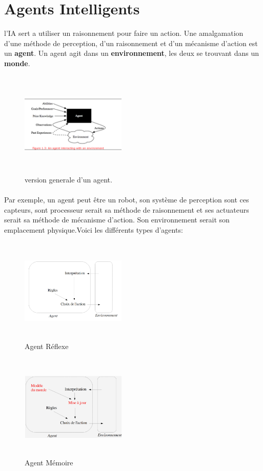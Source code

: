 \documentclass{book}
\begin{document}
\section{Agents Intelligents}
l'IA sert a utiliser un raisonnement pour faire un action. Une amalgamation d'une méthode de perception, d'un raisonnement et d'un mécanisme d'action est un \textbf{agent}. Un agent agit dans un \textbf{environnement}, les deux se trouvant dans un \textbf{monde}.
\begin{figure}[!ht]
\centering
\includegraphics[width=5cm, height = 5cm, keepaspectratio]{Agent_base.png}
\caption{version generale d'un agent.}
\label{fig:Agentbase}
\end{figure}
\paragraph{}
Par exemple, un agent peut être un robot, son système de perception sont ces capteurs, sont processeur serait sa méthode de raisonnement et ses actuateurs serait sa méthode de mécanisme d'action. Son environnement serait son emplacement physique.Voici les différents types d'agents:

\begin{figure}[!ht]
\centering
\includegraphics[width=5cm, height=5cm, keepaspectratio]{Agent_Reflexe.png}
\caption{Agent Réflexe}
\label{fig:agentreflexe}
\end{figure}
	

\begin{figure}[!ht]
\centering
\includegraphics[width=5cm, height=5cm, keepaspectratio]{Agent_Memoire.png}
\caption{Agent Mémoire}
\label{fig:agentmem}
\end{figure}
	
\end{document}
